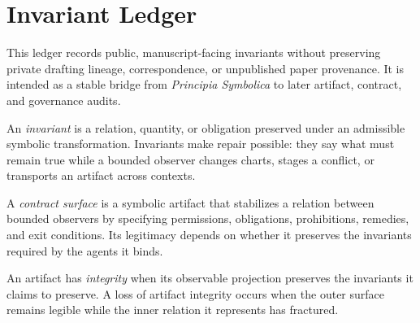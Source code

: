 \section*{Invariant Ledger}
\label{sec:invariant_ledger}

\begin{remark}
This ledger records public, manuscript-facing invariants without preserving
private drafting lineage, correspondence, or unpublished paper provenance. It is
intended as a stable bridge from
\emph{Principia Symbolica} to later artifact, contract, and governance audits.
\end{remark}

\begin{definition}[Invariant]
\label{definition:ps_invariant_public}
An \emph{invariant} is a relation, quantity, or obligation preserved under an
admissible symbolic transformation. Invariants make repair possible: they say
what must remain true while a bounded observer changes charts, stages a
conflict, or transports an artifact across contexts.
\end{definition}

\begin{definition}
\label{definition:ps_contract_surface_public}
A \emph{contract surface} is a symbolic artifact that stabilizes a relation
between bounded observers by specifying permissions, obligations, prohibitions,
remedies, and exit conditions. Its legitimacy depends on whether it preserves
the invariants required by the agents it binds.
\end{definition}

\begin{definition}
\label{definition:ps_artifact_integrity_public}
An artifact has \emph{integrity} when its observable projection preserves the
invariants it claims to preserve. A loss of artifact integrity occurs when the
outer surface remains legible while the inner relation it represents has
fractured.
\end{definition}

